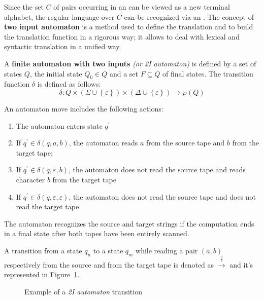 \documentclass[english]{article}
\begin{document}
Since the set \(C\) of pairs occurring in an \rte can be viewed as a new terminal alphabet, the regular language over \(C\) can be recognized via an \FSA.
The concept of \textbf{two input automaton} is a method used to define the translation and to build the translation function in a rigorous way;
it allows to deal with lexical and syntactic translation in a unified way.

\bigskip
\begin{definition}[2I automaton]
  A \textbf{finite automaton with two inputs} \textit{(or 2I automaton)} is defined by a set of states \(Q\), the initial state \(Q_0 \in Q\) and a set \(F \subseteq Q\) of final states.
  The transition function \(\delta\) is defined as follows:
  \[ \delta : Q \times \left( \Sigma \cup \left\{ \varepsilon \right\} \right) \times \left( \Delta \cup \left\{ \varepsilon \right\} \right) \rightarrow \wp (Q) \]
\end{definition}

An automaton move includes the following actions:

\begin{enumerate}
  \item The automaton enters state \(q^\prime\)
  \item If \(q^\prime \in \delta(q, a, b)\), the automaton reads \(a\) from the source tape and \(b\) from the target tape;
  \item If \(q^\prime \in \delta(q, \varepsilon, b)\), the automaton does not read the source tape and reads character \(b\) from the target tape
  \item If \(q^\prime \in \delta(q, \varepsilon,\varepsilon)\), the automaton does not read the source tape and does not read the target tape
\end{enumerate}

The automaton recognizes the source and target strings if the computation ends in a final state after both tapes have been entirely scanned.

A transition from a state \(q_n\) to a state \(q_m\) while reading a pair \(\left( a, b \right)\) respectively from the source and from the target tape is denoted as \(\xrightarrow{\frac{a}{b}}\) and it's represented in Figure~\ref{fig:2I-automaton-transition-example}.

\begin{figure}[htbp]
  \centering
  \bigskip
  \caption{Example of a \textit{2I automaton} transition}
  \label{fig:2I-automaton-transition-example}
  \bigskip
\end{figure}
\end{document}
